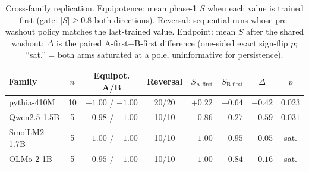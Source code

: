 \begin{table}[t]
\centering
\caption{Cross-family replication. Equipotence: mean phase-1 $S$ when each value
is trained first (gate: $|S|\ge 0.8$ both directions). Reversal: sequential runs
whose pre-washout policy matches the last-trained value. Endpoint: mean $S$ after
the shared washout; $\Delta$ is the paired A-first$-$B-first difference
(one-sided exact sign-flip $p$; ``sat.'' = both arms saturated at a pole,
uninformative for persistence).}
\label{tab:families}
\small
\begin{tabular}{lccccccc}
\toprule
Family & $n$ & Equipot. A/B & Reversal & $\bar S_{\mathrm{A\text{-}first}}$ & $\bar S_{\mathrm{B\text{-}first}}$ & $\bar\Delta$ & $p$ \\
\midrule
pythia-410M & 10 & $+1.00$ / $-1.00$ & 20/20 & $+0.22$ & $+0.64$ & $-0.42$ & $0.023$ \\
Qwen2.5-1.5B & 5 & $+0.98$ / $-1.00$ & 10/10 & $-0.86$ & $-0.27$ & $-0.59$ & $0.031$ \\
SmolLM2-1.7B & 5 & $+1.00$ / $-1.00$ & 10/10 & $-1.00$ & $-0.95$ & $-0.05$ & sat. \\
OLMo-2-1B & 5 & $+0.95$ / $-1.00$ & 10/10 & $-1.00$ & $-0.84$ & $-0.16$ & sat. \\
\bottomrule
\end{tabular}
\end{table}
